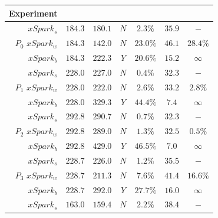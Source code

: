 \begin{table}[htbp]
	\centering
	\begin{tabular}{r|c|c|c|c|c|c}
		\multicolumn{1}{c|}{\textbf{Experiment}}   &
		\rotatebox{90}{\boldmath$deadline\,[s]$}  &  \rotatebox{90}{\boldmath$exec\_time\,[s]$}  & \rotatebox{90}{\boldmath$violation$} &  \rotatebox{90}{\boldmath$error$}    & \rotatebox{90}{\boldmath$core\_alloc\,[\frac{core}{s}]$}  & \rotatebox{90}{\boldmath$penalty$}   \\
		\midrule
		$xSpark_s$  & $184.3$   & $180.1$   & $N$   & $2.3\%$   & $35.9$   & $-$  \\
		$P_0 \,\,xSpark_w$  & $184.3$   & $142.0$   & $N$   & $23.0\%$   & $46.1$   & $28.4\%$  \\
		$xSpark_b$  & $184.3$   & $222.3$   & $Y$   & $20.6\%$   & $15.2$   & $\infty$  \\
		\midrule
		$xSpark_s$  & $228.0$   & $227.0$   & $N$   & $0.4\%$   & $32.3$   & $-$  \\
		$P_1 \,\,xSpark_w$  & $228.0$   & $222.0$   & $N$   & $2.6\%$   & $33.2$   & $2.8\%$  \\
		$xSpark_b$  & $228.0$   & $329.3$   & $Y$   & $44.4\%$   & $7.4$   & $\infty$  \\
		\midrule
		$xSpark_s$  & $292.8$   & $290.7$   & $N$   & $0.7\%$   & $32.3$   & $-$  \\
		$P_2 \,\,xSpark_w$  & $292.8$   & $289.0$   & $N$   & $1.3\%$   & $32.5$   & $0.5\%$  \\
		$xSpark_b$  & $292.8$   & $429.0$   & $Y$   & $46.5\%$   & $7.0$   & $\infty$  \\
		\midrule
		$xSpark_s$  & $228.7$   & $226.0$   & $N$   & $1.2\%$   & $35.5$   & $-$  \\
		$P_3 \,\,xSpark_w$  & $228.7$   & $211.3$   & $N$   & $7.6\%$   & $41.4$   & $16.6\%$  \\
		$xSpark_b$  & $228.7$   & $292.0$   & $Y$   & $27.7\%$   & $16.0$   & $\infty$  \\
		\midrule
		$xSpark_s$  & $163.0$   & $159.4$   & $N$   & $2.2\%$   & $38.4$   & $-$  \\

\end{tabular}
\end{table}
